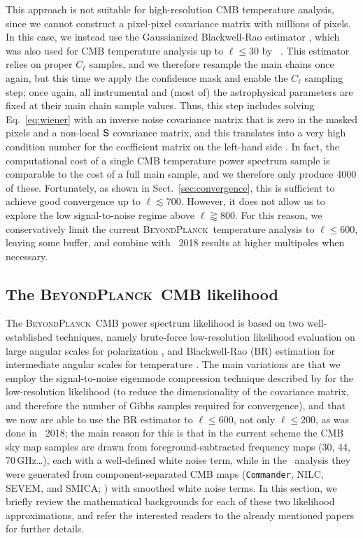 \documentclass[onecolumn]{aa}
\def\commander{\texttt{Commander}}
\renewcommand{\S}[0]{\tens{S}}
\newcommand{\BP}{\textsc{BeyondPlanck}}
\begin{document}
This approach is not suitable for high-resolution CMB temperature
analysis, since we cannot construct a pixel-pixel covariance matrix
with millions of pixels. In this case, we instead use the Gaussianized
Blackwell-Rao estimator \citep{chu2005,rudjord:2009}, which was also
used for CMB temperature analysis up to $\ell\le30$ by
\Planck\ \citep[e.g.,][]{planck2016-l05}. This estimator relies on
proper $C_{\ell}$ samples, and we therefore resample the main chains
once again, but this time we apply the confidence mask and enable the
$C_{\ell}$ sampling step; once again, all instrumental and (most of)
the astrophysical parameters are fixed at their main chain sample
values. Thus, this step includes solving Eq.~\eqref{eq:wiener} with an
inverse noise covariance matrix that is zero in the masked pixels and
a non-local $\S$ covariance matrix, and this translates into a very
high condition number for the coefficient matrix on the left-hand side
\citep{seljebotn:2019}. In fact, the computational cost of a single
CMB temperature power spectrum sample is comparable to the cost of a
full main sample, and we therefore only produce 4000 of
these. Fortunately, as shown in Sect.~\ref{sec:convergence}, this is
sufficient to achieve good convergence up to $\ell\lesssim
700$. However, it does not allow us to explore the low signal-to-noise
regime above $\ell\gtrapprox 800$. For this reason, we conservatively limit the current
\BP\ temperature analysis to $\ell\le 600$, leaving some buffer, and
combine with \Planck\ 2018 results at higher multipoles when
necessary.


\subsection{The \BP\ CMB likelihood}
\label{subsec:cmb_like_bp}

The \BP\ CMB power spectrum likelihood is based on two
well-established techniques, namely brute-force low-resolution
likelihood evaluation on large angular scales for polarization
\citep[e.g.,][]{page2007,planck2016-l05}, and Blackwell-Rao (BR)
estimation for intermediate angular scales for temperature
\citep{chu2005,rudjord:2009,planck2014-a13}. The main variations are
that we employ the signal-to-noise eigenmode compression technique
described by \citet{tegmark1997,gjerlow2015} for the low-resolution
likelihood (to reduce the dimensionality of the covariance matrix, and
therefore the number of Gibbs samples required for convergence), and
that we now are able to use the BR estimator to $\ell\le 600$, not
only $\ell\le200$, as was done in \Planck\ 2018; the main reason for
this is that in the current scheme the CMB sky map samples are drawn
from foreground-subtracted frequency maps (30, 44, 70\,GHz\ldots),
each with a well-defined white noise term, while in the
\Planck\ analysis they were generated from component-separated CMB
maps (\commander, NILC, SEVEM, and SMICA; \citealp{planck2016-l04})
with smoothed white noise terms. In this section, we briefly review
the mathematical backgrounds for each of these two likelihood
approximations, and refer the interested readers to the already
mentioned papers for further details.
\end{document}
